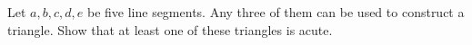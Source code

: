 Let $a, b, c, d, e$ be five line segments. Any three of them can be used to construct a triangle. Show that at least one of these triangles is acute.
